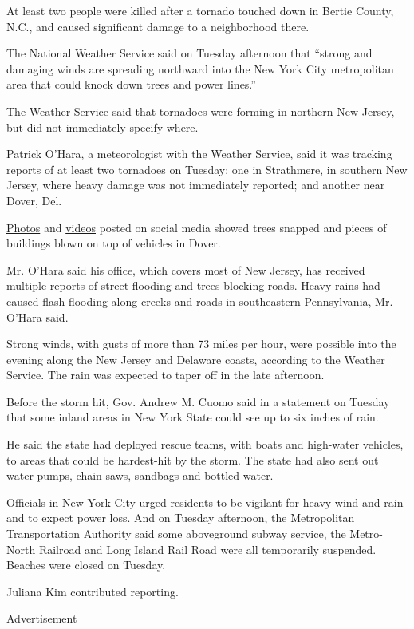 At least two people were killed after a tornado touched down in Bertie
County, N.C., and caused significant damage to a neighborhood there.

The National Weather Service said on Tuesday afternoon that ``strong and
damaging winds are spreading northward into the New York City
metropolitan area that could knock down trees and power lines.''

The Weather Service said that tornadoes were forming in northern New
Jersey, but did not immediately specify where.

Patrick O'Hara, a meteorologist with the Weather Service, said it was
tracking reports of at least two tornadoes on Tuesday: one in
Strathmere, in southern New Jersey, where heavy damage was not
immediately reported; and another near Dover, Del.

\href{https://twitter.com/RichWirdzekWx/status/1290684400825438208}{Photos}
and
\href{https://twitter.com/DKDRinc/status/1290688365830995969}{videos}
posted on social media showed trees snapped and pieces of buildings
blown on top of vehicles in Dover.

Mr. O'Hara said his office, which covers most of New Jersey, has
received multiple reports of street flooding and trees blocking roads.
Heavy rains had caused flash flooding along creeks and roads in
southeastern Pennsylvania, Mr. O'Hara said.

Strong winds, with gusts of more than 73 miles per hour, were possible
into the evening along the New Jersey and Delaware coasts, according to
the Weather Service. The rain was expected to taper off in the late
afternoon.

Before the storm hit, Gov. Andrew M. Cuomo said in a statement on
Tuesday that some inland areas in New York State could see up to six
inches of rain.

He said the state had deployed rescue teams, with boats and high-water
vehicles, to areas that could be hardest-hit by the storm. The state had
also sent out water pumps, chain saws, sandbags and bottled water.

Officials in New York City urged residents to be vigilant for heavy wind
and rain and to expect power loss. And on Tuesday afternoon, the
Metropolitan Transportation Authority said some aboveground subway
service, the Metro-North Railroad and Long Island Rail Road were all
temporarily suspended. Beaches were closed on Tuesday.

Juliana Kim contributed reporting.

Advertisement

